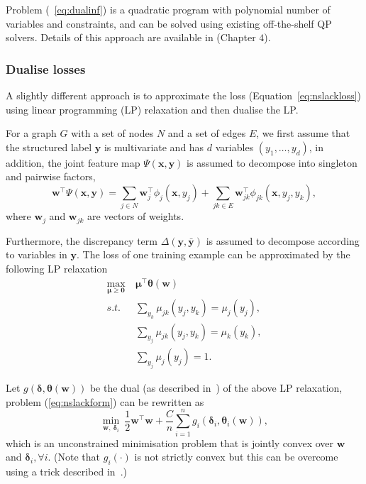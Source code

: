 \documentclass[9pt]{extarticle}
\begin{document}
Problem (~\ref{eq:dualinf}) is a quadratic program with polynomial number of variables and constraints, 
and can be solved using existing off-the-shelf QP solvers.
Details of this approach are available in \cite{taskar2004dissertation} (Chapter $4$).


\subsubsection{Dualise losses}
\label{sec:dualloss}

A slightly different approach is to approximate the loss (Equation~\ref{eq:nslackloss}) using linear programming (LP) relaxation and 
then dualise the LP. 

For a graph $G$ with a set of nodes $N$ and a set of edges $E$, 
we first assume that the structured label $\mathbf{y}$ is multivariate and has $d$ variables $(y_1, \dots, y_d)$,
in addition, the joint feature map $\Psi(\mathbf{x}, \mathbf{y})$ is assumed to decompose into singleton and pairwise factors,
\begin{equation*}
\mathbf{w}^\top \Psi(\mathbf{x}, \mathbf{y}) = 
\sum_{j \in N} \mathbf{w}_j^\top \phi_j(\mathbf{x}, y_j) + \sum_{jk \in E} \mathbf{w}_{jk}^\top \phi_{jk}(\mathbf{x}, y_j, y_k),
\end{equation*}
where $\mathbf{w}_j$ and $\mathbf{w}_{jk}$ are vectors of weights.

Furthermore, the discrepancy term $\Delta(\mathbf{y}, \bar{\mathbf{y}})$ is assumed to decompose according to variables in $\mathbf{y}$.
The loss of one training example can be approximated by the following LP relaxation
\begin{equation*}
\begin{aligned}
\max_{\bm{\mu} \ge \mathbf{0}} ~& \bm{\mu}^\top \bm{\theta}(\mathbf{w}) \\
s.t.~~ ~& \sum_{y_k} \mu_{jk}(y_j, y_k) = \mu_j(y_j), \\
        & \sum_{y_j} \mu_{jk}(y_j, y_k) = \mu_k(y_k), \\
        & \sum_{y_j} \mu_j(y_j) = 1.
\end{aligned}
\end{equation*}

Let $g(\bm{\delta}, \bm{\theta}(\mathbf{w}))$ be the dual (as described in~\cite{werner2007linear}) of the above LP relaxation,
problem (\ref{eq:nslackform}) can be rewritten as
\begin{equation*}
\min_{\mathbf{w}, ~\bm{\delta}_i} ~\frac{1}{2} \mathbf{w}^\top \mathbf{w} + \frac{C}{n} \sum_{i=1}^n g_i(\bm{\delta}_i, \bm{\theta}_i(\mathbf{w})),
\end{equation*}
which is an unconstrained minimisation problem that is jointly convex over $\mathbf{w}$ and $\bm{\delta}_i,\forall i$.
(Note that $g_i(\cdot)$ is not strictly convex but this can be overcome using a trick described in~\cite{meshi2010learning}.)
\end{document}
